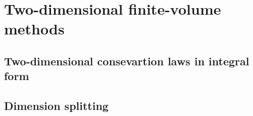 
\chapter{Two-dimensional finite-volume methods}
\label{chp-2d-fv}

\citep{lin:1997}
\citep{lin:2004}
\citep{putmanthesis:2007}
\citep{putman:2007}
\section{Two-dimensional consevartion laws in integral form}
\label{sec-conslaw2d}

\section{Dimension splitting}
\label{sec-dimsplit}


